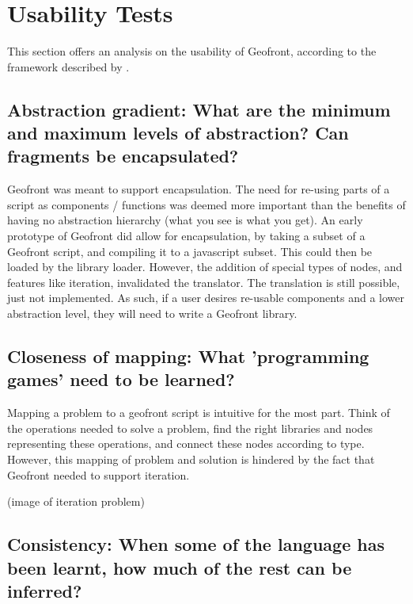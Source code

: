 \section{Usability Tests}
\label{sec:analyses:utilization}

This section offers an analysis on the usability of Geofront, according to the framework described by \cite[]{green_usability_1996}.

\subsection*{Abstraction gradient: What are the minimum and maximum levels of abstraction? Can fragments be encapsulated?}

Geofront was meant to support encapsulation. 
The need for re-using parts of a script as components / functions was deemed more important than the benefits of having no abstraction hierarchy (what you see is what you get).
An early prototype of Geofront did allow for encapsulation, by taking a subset of a Geofront script, and compiling it to a javascript subset. This could then be loaded by the library loader. 
However, the addition of special types of nodes, and features like iteration, invalidated the  translator.
The translation is still possible, just not implemented.  
As such, if a user desires re-usable components and a lower abstraction level, they will need to write a Geofront library.


\subsection*{Closeness of mapping: What 'programming games' need to be learned?}

Mapping a problem to a geofront script is intuitive for the most part.
Think of the operations needed to solve a problem, 
find the right libraries and nodes representing these operations,
and connect these nodes according to type. 
However, this mapping of problem and solution is hindered by the fact that Geofront needed to support iteration. 

(image of iteration problem)



\subsection*{Consistency: When some of the language has been learnt, how much of the rest can be inferred?}

